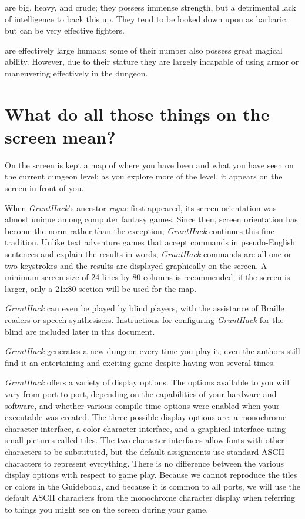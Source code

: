 %
\item[\bb{Ogres}]%
are big, heavy, and crude; they possess immense strength, but
a detrimental lack of intelligence to back this up.  They tend to be looked
down upon as barbaric, but can be very effective fighters.

%
\item[\bb{Giants}]%
are effectively large humans; some of their number also
possess great magical ability.  However, due to their stature they are largely
incapable of using armor or maneuvering effectively in the dungeon.
\elist
\section{What do all those things on the screen mean?}

On the screen is kept a map of where you have
been and what you have seen on the current dungeon level; as you
explore more of the level, it appears on the screen in front of you.

When {\it GruntHack}'s ancestor %
{\it rogue}
first appeared, its screen
orientation was almost unique among computer fantasy games.  Since
then, screen orientation has become the norm rather than the
exception; {\it GruntHack} continues this fine tradition.  Unlike text
adventure games that accept commands in pseudo-English sentences and
explain the results in words, {\it GruntHack} commands are all one or two
keystrokes and the results are displayed graphically on the screen.  A
minimum screen size of 24 lines by 80 columns is recommended; if the
screen is larger, only a 21x80 section will be used for the map.

{\it GruntHack} can even be played by blind players, with the assistance of Braille
readers or speech synthesisers.  Instructions for configuring {\it GruntHack} for
the blind are included later in this document.

{\it GruntHack} generates a new dungeon every time you play it; even the
authors still find it an entertaining and exciting game despite
having won several times.

{\it GruntHack} offers a variety of display options.  The options available to you
will vary from port to port, depending on the capabilities of your
hardware and software, and whether various compile-time options were
enabled when your executable was created.  The three possible display
options are: a monochrome character interface, a color character interface,
and a graphical interface using small pictures called tiles.  The two
character interfaces allow fonts with other characters to be substituted,
but the default assignments use standard ASCII characters to represent
everything.  There is no difference between the various display options
with respect to game play.  Because we cannot reproduce the tiles or
colors in the Guidebook, and because it is common to all ports, we will
use the default ASCII characters from the monochrome character display
when referring to things you might see on the screen during your game.

